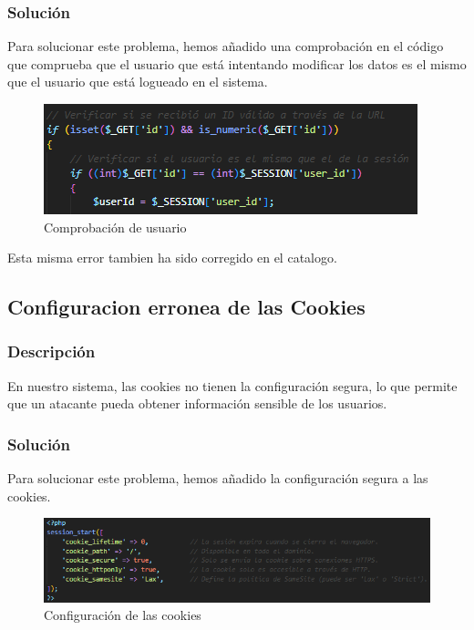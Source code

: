 \documentclass{report}
\begin{document}
                \subsubsection{Solución}
                    Para solucionar este problema, hemos añadido una comprobación en el código que comprueba que el usuario que está intentando modificar los datos es el mismo que el usuario que está logueado en el sistema.
                    \begin{figure}[H]
                        \centering
                        \includegraphics[width=\textwidth]{./img/vulnerabilidades/3.1.1.4.png}
                        \caption{Comprobación de usuario}
                    \end{figure}
                    Esta misma error tambien ha sido corregido en el catalogo.
            \subsection{Configuracion erronea de las Cookies}
                \subsubsection{Descripción}
                    En nuestro sistema, las cookies no tienen la configuración segura, lo que permite que un atacante pueda obtener información sensible de los usuarios.
                \subsubsection{Solución}
                    Para solucionar este problema, hemos añadido la configuración segura a las cookies.
                    \begin{figure}[H]
                        \centering
                        \includegraphics[width=\textwidth]{./img/vulnerabilidades/3.1.2.1.png}
                        \caption{Configuración de las cookies}
                    \end{figure}
        
\end{document}
